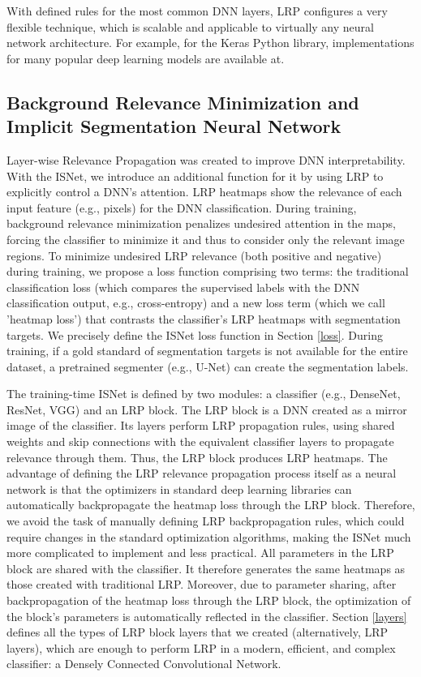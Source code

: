 \documentclass[fleqn,10pt]{wlscirep}
\begin{document}
{With defined rules for the most common DNN layers, LRP configures a very flexible technique, which is scalable and applicable to virtually any neural network architecture. For example, for the Keras Python library, implementations for many popular deep learning models are available at\cite{innvestigate}.

\subsection{Background Relevance Minimization and Implicit Segmentation Neural Network}
\label{IsNetSec}

Layer-wise Relevance Propagation was created to improve DNN interpretability\cite{LRP}. With the ISNet, we introduce an additional function for it by using LRP to explicitly control a DNN's attention. LRP heatmaps show the relevance of each input feature (e.g., pixels) for the DNN classification. During training, background relevance minimization penalizes undesired attention in the maps, forcing the classifier to minimize it and thus to consider only the relevant image regions. To minimize undesired LRP relevance (both positive and negative) during training, we propose a loss function comprising two terms: the traditional classification loss (which compares the supervised labels with the DNN classification output, e.g., cross-entropy) and a new loss term (which we call 'heatmap loss') that contrasts the classifier's LRP heatmaps with segmentation targets. We precisely define the ISNet loss function in Section \ref{loss}. During training, if a gold standard of segmentation targets is not available for the entire dataset, a pretrained segmenter (e.g., U-Net) can create the segmentation labels.

The training-time ISNet is defined by two modules: a classifier (e.g., DenseNet\cite{DenseNet}, ResNet\cite{ResNet}, VGG\cite{VGG}) and an LRP block. The LRP block is a DNN created as a mirror image of the classifier. Its layers perform LRP propagation rules, using shared weights and skip connections with the equivalent classifier layers to propagate relevance through them. Thus, the LRP block produces LRP heatmaps. The advantage of defining the LRP relevance propagation process itself as a neural network is that the optimizers in standard deep learning libraries can automatically backpropagate the heatmap loss through the LRP block. Therefore, we avoid the task of manually defining LRP backpropagation rules, which could require changes in the standard optimization algorithms, making the ISNet much more complicated to implement and less practical. All parameters in the LRP block are shared with the classifier. It therefore generates the same heatmaps as those created with traditional LRP. Moreover, due to parameter sharing, after backpropagation of the heatmap loss through the LRP block, the optimization of the block's parameters is automatically reflected in the classifier. Section \ref{layers} defines all the types of LRP block layers that we created (alternatively, LRP layers), which are enough to perform LRP in a modern, efficient, and complex classifier: a Densely Connected Convolutional Network\cite{DenseNet}. 

}
\end{document}
